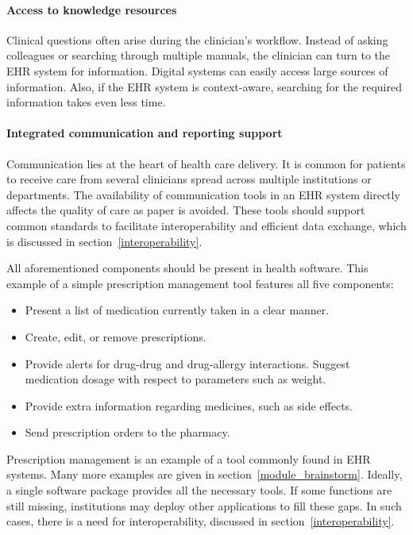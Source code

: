     \paragraph{Access to knowledge resources} Clinical questions often arise during the clinician's workflow. Instead of asking colleagues or searching through multiple manuals, the clinician can turn to the EHR system for information. Digital systems can easily access large sources of information. Also, if the EHR system is context-aware, searching for the required information takes even less time. 

    \paragraph{Integrated communication and reporting support} Communication lies at the heart of health care delivery. It is common for patients to receive care from several clinicians spread across multiple institutions or departments. The availability of communication tools in an EHR system directly affects the quality of care as paper is avoided. These tools should support common standards to facilitate interoperability and efficient data exchange, which is discussed in section~\ref{interoperability}.\bigskip

    \noindent All aforementioned components should be present in health software. This example of a simple prescription management tool features all five components:
    \begin{itemize}
        \item Present a list of medication currently taken in a clear manner.
        \item Create, edit, or remove prescriptions.
        \item Provide alerts for drug-drug and drug-allergy interactions. Suggest medication dosage with respect to parameters such as weight.
        \item Provide extra information regarding medicines, such as side effects.
        \item Send prescription orders to the pharmacy.
    \end{itemize}

    \noindent Prescription management is an example of a tool commonly found in EHR systems. Many more examples are given in section~\ref{module_brainstorm}. Ideally, a single software package provides all the necessary tools. If some functions are still missing, institutions may deploy other applications to fill these gaps. In such cases, there is a need for interoperability, discussed in section~\ref{interoperability}.

